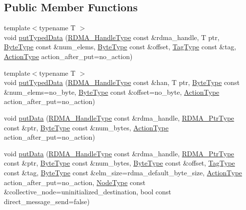 \subsection*{Public Member Functions}
\begin{DoxyCompactItemize}
\item 
{\footnotesize template$<$typename T $>$ }\\void \hyperlink{structvt_1_1rdma_1_1_r_d_m_a_manager_a30167dbd8b0165a273a9d91c84acded1}{put\+Typed\+Data} (\hyperlink{namespacevt_a10442579ec4e7ebef223818e64bcf908}{R\+D\+M\+A\+\_\+\+Handle\+Type} const \&rdma\+\_\+handle, T ptr, \hyperlink{namespacevt_aab8d55968084610ce3b17057981e9300}{Byte\+Type} const \&num\+\_\+elems, \hyperlink{namespacevt_aab8d55968084610ce3b17057981e9300}{Byte\+Type} const \&offset, \hyperlink{namespacevt_a84ab281dae04a52a4b243d6bf62d0e52}{Tag\+Type} const \&tag, \hyperlink{namespacevt_ae0a5a7b18cc99d7b732cb4d44f46b0f3}{Action\+Type} action\+\_\+after\+\_\+put=no\+\_\+action)
\item 
{\footnotesize template$<$typename T $>$ }\\void \hyperlink{structvt_1_1rdma_1_1_r_d_m_a_manager_a553764f2d91b42cf97991bbeadb75a5c}{put\+Typed\+Data} (\hyperlink{namespacevt_a10442579ec4e7ebef223818e64bcf908}{R\+D\+M\+A\+\_\+\+Handle\+Type} const \&han, T ptr, \hyperlink{namespacevt_aab8d55968084610ce3b17057981e9300}{Byte\+Type} const \&num\+\_\+elems=no\+\_\+byte, \hyperlink{namespacevt_aab8d55968084610ce3b17057981e9300}{Byte\+Type} const \&offset=no\+\_\+byte, \hyperlink{namespacevt_ae0a5a7b18cc99d7b732cb4d44f46b0f3}{Action\+Type} action\+\_\+after\+\_\+put=no\+\_\+action)
\item 
void \hyperlink{structvt_1_1rdma_1_1_r_d_m_a_manager_a651ca7aaa9fdbf404c41157b883407e2}{put\+Data} (\hyperlink{namespacevt_a10442579ec4e7ebef223818e64bcf908}{R\+D\+M\+A\+\_\+\+Handle\+Type} const \&rdma\+\_\+handle, \hyperlink{namespacevt_a9e2c953286c7616f7c218e9951790776}{R\+D\+M\+A\+\_\+\+Ptr\+Type} const \&ptr, \hyperlink{namespacevt_aab8d55968084610ce3b17057981e9300}{Byte\+Type} const \&num\+\_\+bytes, \hyperlink{namespacevt_ae0a5a7b18cc99d7b732cb4d44f46b0f3}{Action\+Type} action\+\_\+after\+\_\+put=no\+\_\+action)
\item 
void \hyperlink{structvt_1_1rdma_1_1_r_d_m_a_manager_a839c0031a48c5341494b119b0f10bafa}{put\+Data} (\hyperlink{namespacevt_a10442579ec4e7ebef223818e64bcf908}{R\+D\+M\+A\+\_\+\+Handle\+Type} const \&rdma\+\_\+handle, \hyperlink{namespacevt_a9e2c953286c7616f7c218e9951790776}{R\+D\+M\+A\+\_\+\+Ptr\+Type} const \&ptr, \hyperlink{namespacevt_aab8d55968084610ce3b17057981e9300}{Byte\+Type} const \&num\+\_\+bytes, \hyperlink{namespacevt_aab8d55968084610ce3b17057981e9300}{Byte\+Type} const \&offset, \hyperlink{namespacevt_a84ab281dae04a52a4b243d6bf62d0e52}{Tag\+Type} const \&tag, \hyperlink{namespacevt_aab8d55968084610ce3b17057981e9300}{Byte\+Type} const \&elm\+\_\+size=rdma\+\_\+default\+\_\+byte\+\_\+size, \hyperlink{namespacevt_ae0a5a7b18cc99d7b732cb4d44f46b0f3}{Action\+Type} action\+\_\+after\+\_\+put=no\+\_\+action, \hyperlink{namespacevt_a866da9d0efc19c0a1ce79e9e492f47e2}{Node\+Type} const \&collective\+\_\+node=uninitialized\+\_\+destination, bool const direct\+\_\+message\+\_\+send=false)

\end{DoxyCompactItemize}
